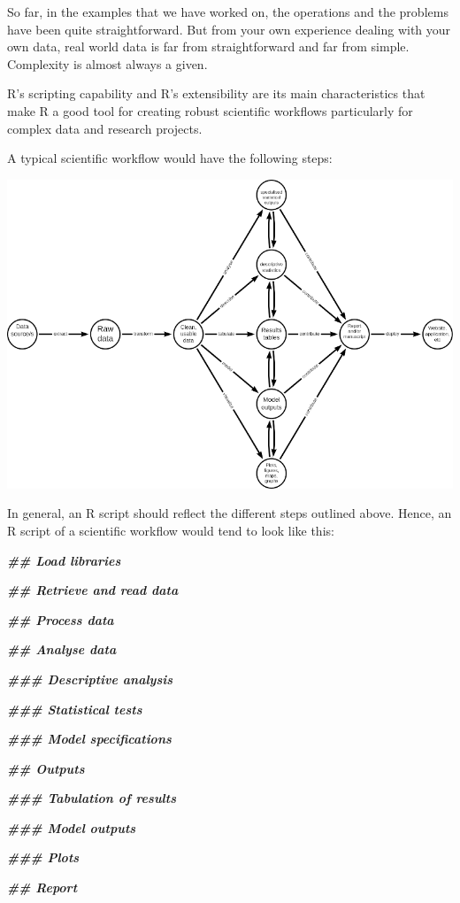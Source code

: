 \documentclass[
  12pt,
]{book}
\newenvironment{Shaded}{\begin{snugshade}}{\end{snugshade}}
\newcommand{\DocumentationTok}[1]{\textcolor[rgb]{0.56,0.35,0.01}{\textbf{\textit{#1}}}}
\begin{document}
So far, in the examples that we have worked on, the operations and the problems have been quite straightforward. But from your own experience dealing with your own data, real world data is far from straightforward and far from simple. Complexity is almost always a given.

R's scripting capability and R's extensibility are its main characteristics that make R a good tool for creating robust scientific workflows particularly for complex data and research projects.

A typical scientific workflow would have the following steps:

\begin{center}\includegraphics[width=11.11in]{images/scientific-workflow} \end{center}

In general, an R script should reflect the different steps outlined above. Hence, an R script of a scientific workflow would tend to look like this:

\begin{Shaded}
\begin{Highlighting}[]
\DocumentationTok{\#\# Load libraries}


\DocumentationTok{\#\# Retrieve and read data}


\DocumentationTok{\#\# Process data}


\DocumentationTok{\#\# Analyse data}

\DocumentationTok{\#\#\# Descriptive analysis}

\DocumentationTok{\#\#\# Statistical tests}

\DocumentationTok{\#\#\# Model specifications}


\DocumentationTok{\#\# Outputs}

\DocumentationTok{\#\#\# Tabulation of results}

\DocumentationTok{\#\#\# Model outputs}

\DocumentationTok{\#\#\# Plots}


\DocumentationTok{\#\# Report}

\end{Highlighting}
\end{Shaded}
\end{document}
